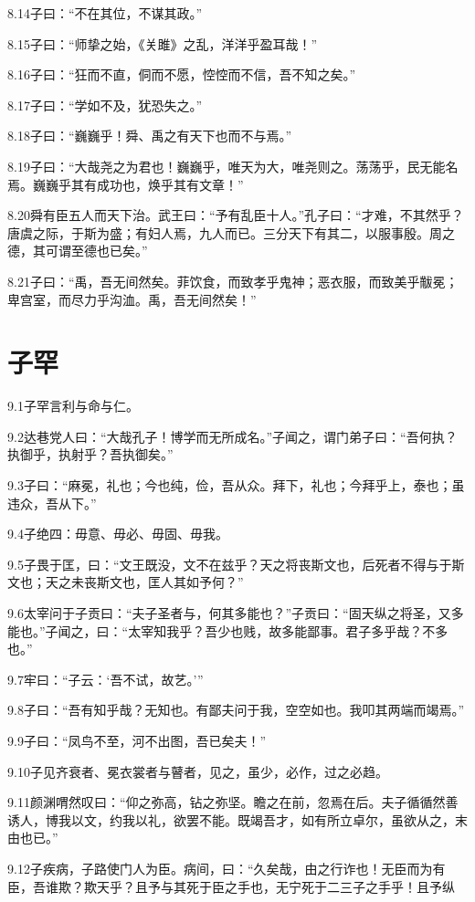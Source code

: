 \documentclass[a4paper,12pt,UTF8,twoside]{ctexbook}
\begin{document}
8.14子曰：“不在其位，不谋其政。”

8.15子曰：“师挚之始，《关雎》之乱，洋洋乎盈耳哉！”

8.16子曰：“狂而不直，侗而不愿，悾悾而不信，吾不知之矣。”

8.17子曰：“学如不及，犹恐失之。”

8.18子曰：“巍巍乎！舜、禹之有天下也而不与焉。”

8.19子曰：“大哉尧之为君也！巍巍乎，唯天为大，唯尧则之。荡荡乎，民无能名焉。巍巍乎其有成功也，焕乎其有文章！”

8.20舜有臣五人而天下治。武王曰：“予有乱臣十人。”孔子曰：“才难，不其然乎？唐虞之际，于斯为盛；有妇人焉，九人而已。三分天下有其二，以服事殷。周之德，其可谓至德也已矣。”

8.21子曰：“禹，吾无间然矣。菲饮食，而致孝乎鬼神；恶衣服，而致美乎黻冕；卑宫室，而尽力乎沟洫。禹，吾无间然矣！”

\chapter{子罕}
9.1子罕言利与命与仁。

9.2达巷党人曰：“大哉孔子！博学而无所成名。”子闻之，谓门弟子曰：“吾何执？执御乎，执射乎？吾执御矣。”

9.3子曰：“麻冕，礼也；今也纯，俭，吾从众。拜下，礼也；今拜乎上，泰也；虽违众，吾从下。”

9.4子绝四：毋意、毋必、毋固、毋我。

9.5子畏于匡，曰：“文王既没，文不在兹乎？天之将丧斯文也，后死者不得与于斯文也；天之未丧斯文也，匡人其如予何？”

9.6太宰问于子贡曰：“夫子圣者与，何其多能也？”子贡曰：“固天纵之将圣，又多能也。”子闻之，曰：“太宰知我乎？吾少也贱，故多能鄙事。君子多乎哉？不多也。”

9.7牢曰：“子云：‘吾不试，故艺。’”

9.8子曰：“吾有知乎哉？无知也。有鄙夫问于我，空空如也。我叩其两端而竭焉。”

9.9子曰：“凤鸟不至，河不出图，吾已矣夫！”

9.10子见齐衰者、冕衣裳者与瞽者，见之，虽少，必作，过之必趋。

9.11颜渊喟然叹曰：“仰之弥高，钻之弥坚。瞻之在前，忽焉在后。夫子循循然善诱人，博我以文，约我以礼，欲罢不能。既竭吾才，如有所立卓尔，虽欲从之，末由也已。”

9.12子疾病，子路使门人为臣。病间，曰：“久矣哉，由之行诈也！无臣而为有臣，吾谁欺？欺天乎？且予与其死于臣之手也，无宁死于二三子之手乎！且予纵
\end{document}
